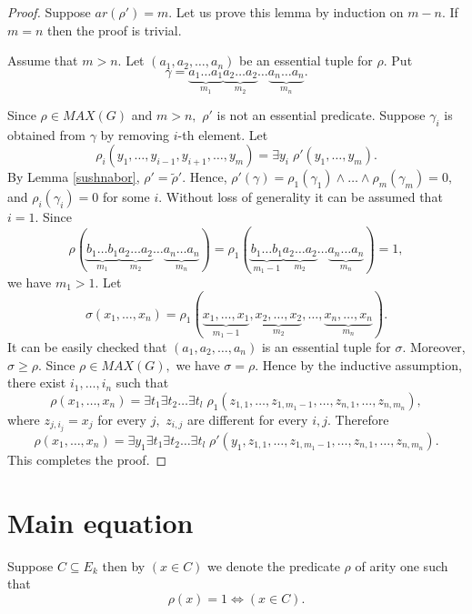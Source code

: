 \documentclass{au}
\theoremstyle{plain}
\theoremstyle{definition}
\theoremstyle{remark}
\numberwithin{equation}{section}
\begin{document}
\begin{proof}

Suppose $ar(\rho') = m.$
Let us prove this lemma by induction on $m-n.$
If $m=n$ then the proof is trivial.

Assume that $m>n.$
Let $(a_{1},a_{2},\ldots,a_{n})$ be an essential tuple for $\rho.$
Put $$\gamma =
\underbrace{a_{1}\ldots a_{1}}_{m_{1}}
\underbrace{a_{2}\ldots a_{2}}_{m_{2}}
\ldots
\underbrace{a_{n}\ldots a_{n}}_{m_{n}}.$$

Since $\rho \in MAX(G)$ and $m>n,$ $\rho'$ is not an essential predicate.
Suppose $\gamma_{i}$ is obtained from $\gamma$ by removing $i$-th element.
Let $$\rho_{i}(y_{1},\ldots,y_{i-1},y_{i+1},\ldots,y_{m}) = \exists y_{i} \; \rho'(y_{1},\ldots,y_{m}).$$
By Lemma \ref{sushnabor},
$\rho' = \widetilde\rho'.$
Hence, $\rho'(\gamma) = \rho_{1}(\gamma_{1})\wedge \ldots
\wedge \rho_{m}(\gamma_{m})=0,$
and $\rho_{i}(\gamma_{i}) = 0$ for some $i.$
Without loss of generality it can be assumed that
$i=1.$
Since $$\rho(\underbrace{b_{1}\ldots b_{1}}_{m_{1}}
\underbrace{a_{2}\ldots a_{2}}_{m_{2}}
\ldots
\underbrace{a_{n}\ldots a_{n}}_{m_{n}}) =
\rho_{1}(\underbrace{b_{1}\ldots b_{1}}_{m_{1}-1}
\underbrace{a_{2}\ldots a_{2}}_{m_{2}}
\ldots
\underbrace{a_{n}\ldots a_{n}}_{m_{n}})= 1,$$
we have $m_{1}>1.$ Let
$$\sigma(x_{1},\ldots,x_{n}) =
\rho_{1}(\underbrace{x_{1},\ldots,x_{1}}_{m_{1}-1},
\underbrace{x_{2},\ldots,x_{2}}_{m_{2}},
\ldots,
\underbrace{x_{n},\ldots,x_{n}}_{m_{n}}).$$
It can be easily checked that
$(a_{1},a_{2},\ldots,a_{n})$ is an essential tuple for $\sigma.$
Moreover, $\sigma\ge \rho.$
Since $\rho \in MAX(G),$  we have $\sigma = \rho.$
Hence by the inductive assumption,
there exist $i_{1},\ldots,i_{n}$ such that
$$\rho(x_{1},\ldots,x_{n}) =
\exists t_{1} \exists t_{2}\ldots \exists  t_{l} \;  \rho_{1}(z_{1,1},\ldots,z_{1,m_{1}-1},
\ldots,z_{n,1},\ldots,z_{n,m_{n}}),$$
where $z_{j,i_{j}} = x_{j}$ for every $j,$
$z_{i,j}$ are different for every $i,j.$
Therefore
$$\rho(x_{1},\ldots,x_{n}) =
\exists y_{1} \exists t_{1} \exists t_{2}\ldots \exists  t_{l} \;
\rho' (y_{1},z_{1,1},\ldots,z_{1,m_{1}-1}, 
\ldots,z_{n,1},\ldots,z_{n,m_{n}}).$$
This completes the proof.

\end{proof}

\section{Main equation}

Suppose $C\subseteq E_{k}$
then by $(x\in C)$ we denote the predicate $\rho$ of arity one such that
$$\rho(x) = 1 \Longleftrightarrow (x\in C).$$
\end{document}
